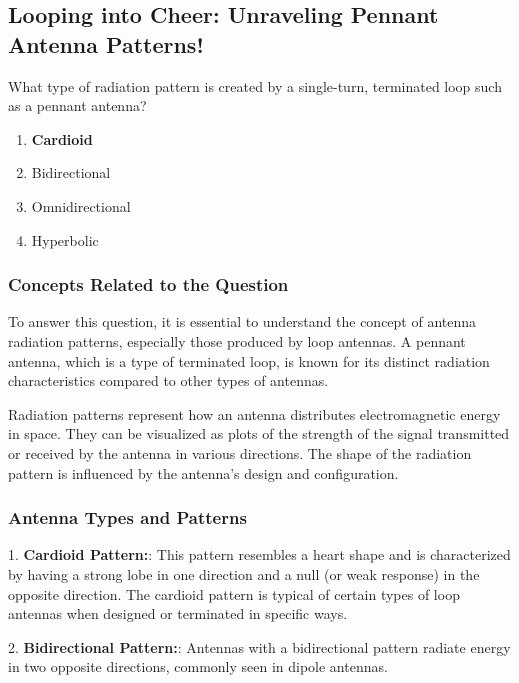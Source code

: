 \subsection{Looping into Cheer: Unraveling Pennant Antenna Patterns!}

\begin{tcolorbox}[colback=gray!10, colframe=black, title=E9H09]
What type of radiation pattern is created by a single-turn, terminated loop such as a pennant antenna? 

\begin{enumerate}[label=\Alph*.]
    \item \textbf{Cardioid}
    \item Bidirectional
    \item Omnidirectional
    \item Hyperbolic
\end{enumerate} \end{tcolorbox}

\subsubsection{Concepts Related to the Question}

To answer this question, it is essential to understand the concept of antenna radiation patterns, especially those produced by loop antennas. A pennant antenna, which is a type of terminated loop, is known for its distinct radiation characteristics compared to other types of antennas.

Radiation patterns represent how an antenna distributes electromagnetic energy in space. They can be visualized as plots of the strength of the signal transmitted or received by the antenna in various directions. The shape of the radiation pattern is influenced by the antenna's design and configuration.

\subsubsection{Antenna Types and Patterns}

1. \textbf{Cardioid Pattern:}: This pattern resembles a heart shape and is characterized by having a strong lobe in one direction and a null (or weak response) in the opposite direction. The cardioid pattern is typical of certain types of loop antennas when designed or terminated in specific ways.

2. \textbf{Bidirectional Pattern:}: Antennas with a bidirectional pattern radiate energy in two opposite directions, commonly seen in dipole antennas.

